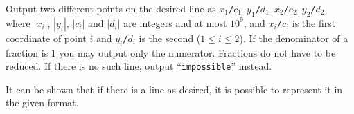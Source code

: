 \newpage
\begin{Output}
    Output two different points on the desired line as \texttt{$x_1$/$c_1$ $y_1$/$d_1$ $x_2$/$c_2$ $y_2$/$d_2$},
	where $|x_i|$, $|y_i|$, $|c_i|$ and $|d_i|$ are integers and at most $10^9$,
	and \texttt{$x_i$/$c_i$} is the first coordinate of point $i$ and \texttt{$y_i$/$d_i$} is the second ($1\leq i\leq2$).
    If the denominator of a fraction is $1$ you may output only the numerator. Fractions do not have to be reduced.
    If there is no such line, output ``\texttt{impossible}'' instead.

	It can be shown that if there is a line as desired, it is possible to represent it in the given format.
\end{Output}
\vspace{-6mm}
